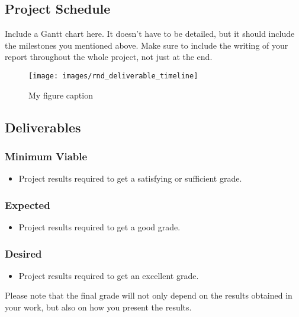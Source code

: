 \documentclass[rnd]{mas_proposal}
\begin{document}
\subsection{Project Schedule}
Include a Gantt chart here. It doesn't have to be detailed, but it should include the milestones you mentioned above.
Make sure to include the writing of your report throughout the whole project, not just at the end.

\begin{figure}[h!]
    \texttt{[image: images/rnd\_deliverable\_timeline]}
    \caption{My figure caption}
    \label{fig:myfigure}
\end{figure}

\subsection{Deliverables}

\subsubsection*{Minimum Viable}
\begin{itemize}
    \item Project results required to get a satisfying or sufficient grade.
\end{itemize}

\subsubsection*{Expected}
\begin{itemize}
    \item Project results required to get a good grade.
\end{itemize}

\subsubsection*{Desired}
\begin{itemize}
    \item Project results required to get an excellent grade.
\end{itemize}

Please note that the final grade will not only depend on the results obtained in your work, but also on how you present the results.

\nocite{*}

\end{document}
